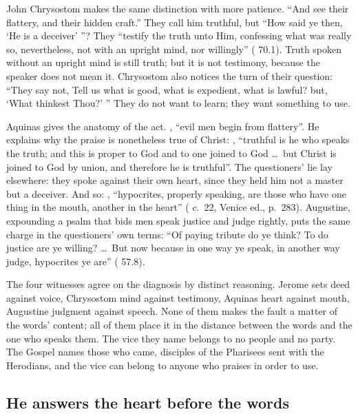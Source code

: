 John Chrysostom makes the same distinction with more patience. ``And see their
flattery, and their hidden craft.'' They call him truthful, but ``How said ye
then, `He is a deceiver' ''? They ``testify the truth unto Him, confessing what
was really so, nevertheless, not with an upright mind, nor willingly''
( 70.1). Truth spoken without an upright mind is
still truth; but it is not testimony, because the speaker does not mean it.
Chrysostom also notices the turn of their question: ``They say not, Tell us
what is good, what is expedient, what is lawful? but, `What thinkest Thou?' ''
They do not want to learn; they want something to use.

Aquinas gives the anatomy of the act. , ``evil men begin from flattery''. He explains why the praise is
nonetheless true of Christ: , ``truthful is he who speaks the
truth; and this is proper to God and to one joined to God \ldots\ but Christ
is joined to God by union, and therefore he is truthful''. The questioners'
lie lay elsewhere: they spoke against their own heart, since they held him not
a master but a deceiver. And so: , ``hypocrites, properly speaking, are those who
have one thing in the mouth, another in the heart'' (
c.~22, Venice ed., p.~283). Augustine, expounding a psalm that bids men speak
justice and judge rightly, puts the same charge in the questioners' own terms:
``Of paying tribute do ye think? To do justice are ye willing? \ldots\ But now
because in one way ye speak, in another way judge, hypocrites ye are''
( 57.8).

The four witnesses agree on the diagnosis by distinct reasoning. Jerome sets
deed against voice, Chrysostom mind against testimony, Aquinas heart against
mouth, Augustine judgment against speech. None of them makes the fault a matter
of the words' content; all of them place it in the distance between the words
and the one who speaks them. The vice they name belongs to no people and no
party. The Gospel names those who came, disciples of the Pharisees sent with
the Herodians, and the vice can belong to anyone who praises in order to
use.

\subsection{He answers the heart before the words}

